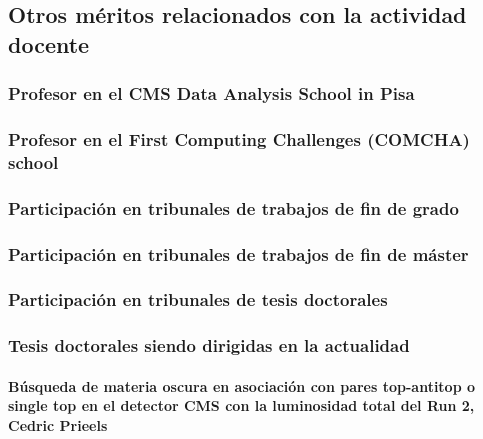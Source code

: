 \documentclass[a4paper, 11pt, twoside, openright]{report}
\begin{document}
\subsection{Otros méritos relacionados con la actividad docente}

\subsubsection{Profesor en el CMS Data Analysis School in Pisa}


\subsubsection{Profesor en el First Computing Challenges (COMCHA) school}


\subsubsection{Participación en tribunales de trabajos de fin de grado}


\subsubsection{Participación en tribunales de trabajos de fin de máster}


\subsubsection{Participación en tribunales de tesis doctorales}



\subsubsection{Tesis doctorales siendo dirigidas en la actualidad}

\paragraph{Búsqueda de materia oscura en asociación con pares top-antitop o single top en el detector CMS con la luminosidad total del Run 2, Cedric Prieels}

\end{document}
